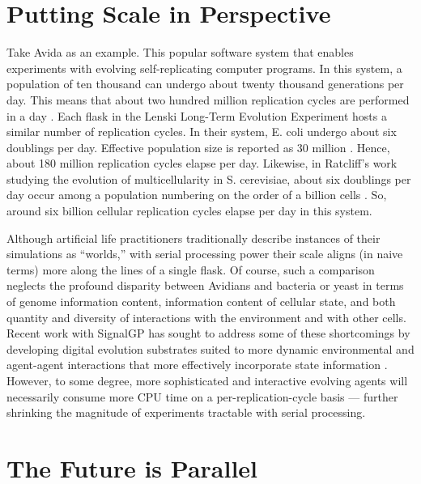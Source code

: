 \section{Putting Scale in Perspective}

Take Avida as an example. This popular software system that enables experiments with evolving self-replicating computer programs.
In this system, a population of ten thousand can undergo about twenty thousand generations per day.
This means that about two hundred million replication cycles are performed in a day \cite{ofria2009artificial}.
Each flask in the Lenski Long-Term Evolution Experiment hosts a similar number of replication cycles.
In their system, E. coli undergo about six doublings per day.
Effective population size is reported as 30 million \cite{good2017dynamics}. Hence, about 180 million replication cycles elapse per day.
Likewise, in Ratcliff’s work studying the evolution of multicellularity in S. cerevisiae, about six doublings per day occur among a population numbering on the order of a billion cells \cite{ratcliff2012experimental}.
So, around six billion cellular replication cycles elapse per day in this system.

Although artificial life practitioners traditionally describe instances of their simulations as “worlds,” with serial processing power their scale aligns (in naive terms) more along the lines of a single flask.
Of course, such a comparison neglects the profound disparity between Avidians and bacteria or yeast in terms of genome information content, information content of cellular state, and both quantity and diversity of interactions with the environment and with other cells.
Recent work with SignalGP has sought to address some of these shortcomings by developing digital evolution substrates suited to more dynamic environmental and agent-agent interactions \cite{lalejini2018evolving} that more effectively incorporate state information \cite{lalejini2021tag,lalejini2020case, moreno2019evaluating}.
However, to some degree, more sophisticated and interactive evolving agents will necessarily consume more CPU time on a per-replication-cycle basis --- further shrinking the magnitude of experiments tractable with serial processing.

\section{The Future is Parallel}


